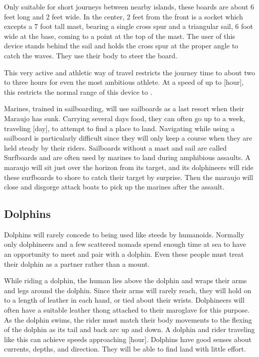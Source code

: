 Only suitable for short journeys between nearby islands, these boards are about 6 feet long and 2 feet wide. In the center, 2 feet from the front is a socket which excepts a 7 foot tall mast, bearing a single cross spur and a triangular sail, 6 foot wide at the base, coming to a point at the top of the mast. The user of this device stands behind the sail and holds the cross spur at the proper angle to catch the waves. They use their body to steer the board.

This very active and athletic way of travel restricts the journey time to about two to three hours for even the most ambitious athlete. At a speed of up to [hour], this restricts the normal range of this device to .

Marines, trained in sailboarding, will use sailboards as a last resort when their Maraujo has sunk. Carrying several days food, they can often go up to a week, traveling [day], to attempt to find a place to land. Navigating while using a sailboard is particularly difficult since they will only keep a course when they are held steady by their riders.
Sailboards without a mast and sail are called Surfboards and are often used by marines to land during amphibious assaults. A maraujo will sit just over the horizon from its target, and its dolphineers will ride these surfboards to shore to catch their target by surprise. Then the maraujo will close and disgorge attack boats to pick up the marines after the assault.
\subsection{Dolphins}
Dolphins will rarely concede to being used like steeds by humanoids. Normally only dolphineers and a few scattered nomads spend enough time at sea to have an opportunity to meet and pair with a dolphin. Even these people must treat their dolphin as a partner rather than a mount.

While riding a dolphin, the human lies above the dolphin and wraps their arms and legs around the dolphin. Since their arms will rarely reach, they will hold on to a length of leather in each hand, or tied about their wrists. Dolphineers will often have a suitable leather thong attached to their maroglave for this purpose. As the dolphin swims, the rider must match their body movements to the flexing of the dolphin as its tail and back arc up and down. A dolphin and rider traveling like this can achieve speeds approaching [hour]. Dolphins have good senses about currents, depths, and direction. They will be able to find land with little effort.

